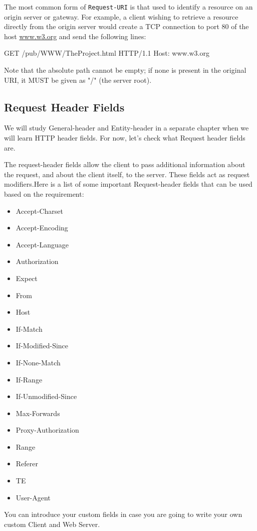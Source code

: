 \documentclass[a4paper,11pt,bahasa]{extarticle}
\begin{document}
The most common form of \verb|Request-URI| is that used to identify a resource on an origin server or 
gateway. For example, a client wishing to retrieve a resource directly from the origin server would 
create a TCP connection to port 80 of the host \url{www.w3.org} and send the following lines:
\begin{textcode}
GET /pub/WWW/TheProject.html HTTP/1.1
Host: www.w3.org
\end{textcode}
Note that the absolute path cannot be empty; if none is present in
the original URI, it MUST be given as "/" (the server root).

\subsection{Request Header Fields}

We will study General-header and Entity-header in a separate chapter when we will learn HTTP header 
fields. For now, let's check what Request header fields are.

The request-header fields allow the client to pass additional information about the request, and about 
the client itself, to the server. These fields act as request modifiers.Here is a list of some important 
Request-header fields that can be used based on the requirement:
\begin{itemize}
\item Accept-Charset
\item Accept-Encoding
\item Accept-Language
\item Authorization
\item Expect
\item From
\item Host
\item If-Match
\item If-Modified-Since
\item If-None-Match
\item If-Range
\item If-Unmodified-Since
\item Max-Forwards
\item Proxy-Authorization
\item Range
\item Referer
\item TE
\item User-Agent
\end{itemize}

You can introduce your custom fields in case you are going to write your own custom
Client and Web Server.
\end{document}
